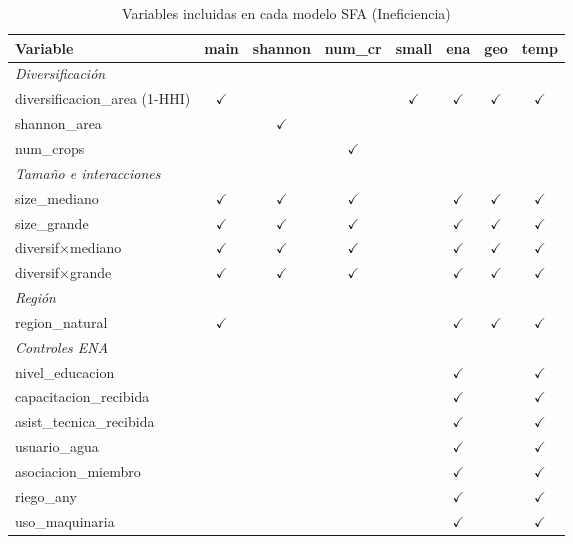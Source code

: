 \documentclass[11pt,a4paper]{article}
\begin{document}
\begin{table}[H]
\centering
\caption{Variables incluidas en cada modelo SFA (Ineficiencia)}
\label{tab:sfa_spec_ineff}
\begin{threeparttable}
\footnotesize
\begin{tabular}{p{4cm}ccccccc}
\toprule
\textbf{Variable} & \textbf{main} & \textbf{shannon} & \textbf{num\_cr} & \textbf{small} & \textbf{ena} & \textbf{geo} & \textbf{temp} \\
\midrule
\multicolumn{8}{l}{\textit{Diversificación}} \\
diversificacion\_area (1-HHI) & $\checkmark$ & & & $\checkmark$ & $\checkmark$ & $\checkmark$ & $\checkmark$ \\
shannon\_area & & $\checkmark$ & & & & & \\
num\_crops & & & $\checkmark$ & & & & \\
\midrule
\multicolumn{8}{l}{\textit{Tamaño e interacciones}} \\
size\_mediano & $\checkmark$ & $\checkmark$ & $\checkmark$ & & $\checkmark$ & $\checkmark$ & $\checkmark$ \\
size\_grande & $\checkmark$ & $\checkmark$ & $\checkmark$ & & $\checkmark$ & $\checkmark$ & $\checkmark$ \\
diversif$\times$mediano & $\checkmark$ & $\checkmark$ & $\checkmark$ & & $\checkmark$ & $\checkmark$ & $\checkmark$ \\
diversif$\times$grande & $\checkmark$ & $\checkmark$ & $\checkmark$ & & $\checkmark$ & $\checkmark$ & $\checkmark$ \\
\midrule
\multicolumn{8}{l}{\textit{Región}} \\
region\_natural & $\checkmark$ & & & & $\checkmark$ & $\checkmark$ & $\checkmark$ \\
\midrule
\multicolumn{8}{l}{\textit{Controles ENA}} \\
nivel\_educacion & & & & & $\checkmark$ & & $\checkmark$ \\
capacitacion\_recibida & & & & & $\checkmark$ & & $\checkmark$ \\
asist\_tecnica\_recibida & & & & & $\checkmark$ & & $\checkmark$ \\
usuario\_agua & & & & & $\checkmark$ & & $\checkmark$ \\
asociacion\_miembro & & & & & $\checkmark$ & & $\checkmark$ \\
riego\_any & & & & & $\checkmark$ & & $\checkmark$ \\
uso\_maquinaria & & & & & $\checkmark$ & & $\checkmark$ \\

\end{tabular}
\end{threeparttable}
\end{table}
\end{document}
